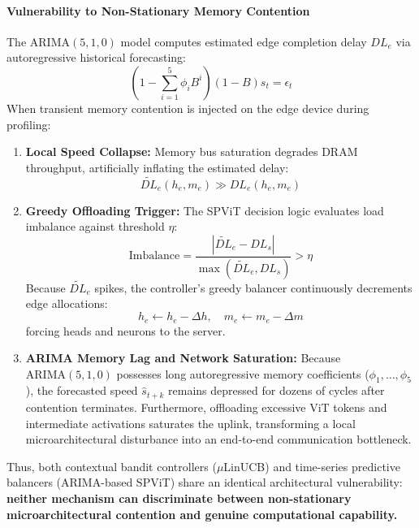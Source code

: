 \paragraph{Vulnerability to Non-Stationary Memory Contention}
The $\text{ARIMA}(5,1,0)$ model computes estimated edge completion delay $DL_e$ via autoregressive historical forecasting:
\begin{equation}
    (1 - \sum_{i=1}^5 \phi_i B^i)(1 - B) s_t = \epsilon_t
\end{equation}
When transient memory contention is injected on the edge device during profiling:
\begin{enumerate}
    \item \textbf{Local Speed Collapse:} Memory bus saturation degrades DRAM throughput, artificially inflating the estimated delay:
    \begin{equation}
        \widetilde{DL}_e(h_e, m_e) \gg DL_e(h_e, m_e)
    \end{equation}
    \item \textbf{Greedy Offloading Trigger:} The SPViT decision logic evaluates load imbalance against threshold $\eta$:
    \begin{equation}
        \text{Imbalance} = \frac{|\widetilde{DL}_e - DL_s|}{\max(\widetilde{DL}_e, DL_s)} > \eta
    \end{equation}
    Because $\widetilde{DL}_e$ spikes, the controller's greedy balancer continuously decrements edge allocations:
    \begin{equation}
        h_e \leftarrow h_e - \Delta h, \quad m_e \leftarrow m_e - \Delta m
    \end{equation}
    forcing heads and neurons to the server.
    \item \textbf{ARIMA Memory Lag and Network Saturation:} Because $\text{ARIMA}(5,1,0)$ possesses long autoregressive memory coefficients ($\phi_1, \dots, \phi_5$), the forecasted speed $\hat{s}_{t+k}$ remains depressed for dozens of cycles after contention terminates. Furthermore, offloading excessive ViT tokens and intermediate activations saturates the uplink, transforming a local microarchitectural disturbance into an end-to-end communication bottleneck.
\end{enumerate}

Thus, both contextual bandit controllers ($\mu$LinUCB) and time-series predictive balancers ($\text{ARIMA}$-based SPViT) share an identical architectural vulnerability: \textbf{neither mechanism can discriminate between non-stationary microarchitectural contention and genuine computational capability.}

